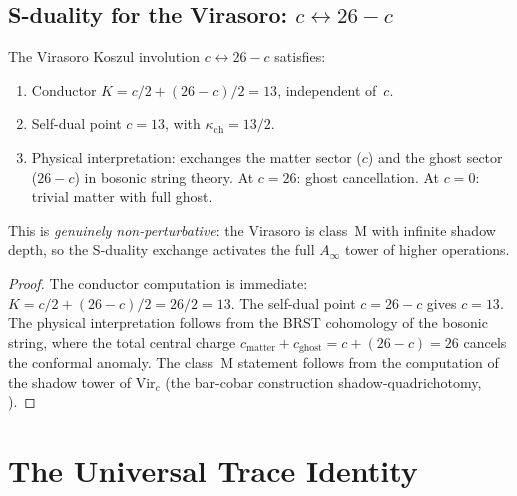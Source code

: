 \subsection{S-duality for the Virasoro: \texorpdfstring{$c \leftrightarrow 26 - c$}{c <-> 26 - c}}
\label{subsec:virasoro-s-duality}

\begin{proposition}
\label{prop:virasoro-s-duality}
The Virasoro Koszul involution $c \leftrightarrow 26 - c$ satisfies:
\begin{enumerate}[label=\textup{(\roman*)}]
 \item Conductor $K = c/2 + (26-c)/2 = 13$, independent of~$c$.
 \item Self-dual point $c = 13$, with $\kappa_{\mathrm{ch}} = 13/2$.
 \item Physical interpretation: exchanges the matter sector ($c$) and the ghost sector ($26 - c$) in bosonic string theory. At $c = 26$: ghost cancellation. At $c = 0$: trivial matter with full ghost.
\end{enumerate}
This is \emph{genuinely non-perturbative}: the Virasoro is class~M with infinite shadow depth, so the S-duality exchange activates the full $A_\infty$ tower of higher operations.
\end{proposition}

\begin{proof}
The conductor computation is immediate: $K = c/2 + (26-c)/2 = 26/2 = 13$. The self-dual point $c = 26 - c$ gives $c = 13$. The physical interpretation follows from the BRST cohomology of the bosonic string, where the total central charge $c_{\mathrm{matter}} + c_{\mathrm{ghost}} = c + (26 - c) = 26$ cancels the conformal anomaly. The class~M statement follows from the computation of the shadow tower of $\mathrm{Vir}_c$ (the bar-cobar construction shadow-quadrichotomy, \cite{VolI}).
\end{proof}

\smallskip\noindent



\section{The Universal Trace Identity}
\label{sec:universal-trace-identity}

